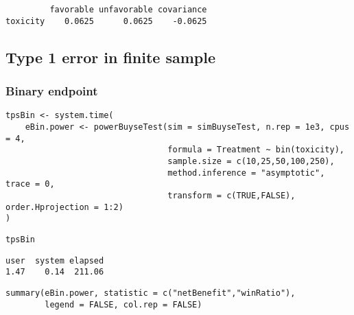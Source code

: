 \documentclass[12pt]{article}
\begin{document}
\begin{verbatim}
         favorable unfavorable covariance
toxicity    0.0625      0.0625    -0.0625
\end{verbatim}

\clearpage

\subsection{Type 1 error in finite sample}
\label{sec:orgf4e5faf}

\subsubsection{Binary endpoint}
\label{sec:org8b4e275}
\lstset{language=r,label= ,caption= ,captionpos=b,numbers=none}
\begin{lstlisting}
tpsBin <- system.time(
	eBin.power <- powerBuyseTest(sim = simBuyseTest, n.rep = 1e3, cpus = 4,
								 formula = Treatment ~ bin(toxicity),
								 sample.size = c(10,25,50,100,250),                                   
								 method.inference = "asymptotic", trace = 0,
								 transform = c(TRUE,FALSE), order.Hprojection = 1:2)
)
\end{lstlisting}

\lstset{language=r,label= ,caption= ,captionpos=b,numbers=none}
\begin{lstlisting}
tpsBin
\end{lstlisting}

\begin{verbatim}
user  system elapsed 
1.47    0.14  211.06
\end{verbatim}

\lstset{language=r,label= ,caption= ,captionpos=b,numbers=none}
\begin{lstlisting}
summary(eBin.power, statistic = c("netBenefit","winRatio"), 
		legend = FALSE, col.rep = FALSE)
\end{lstlisting}
\end{document}

